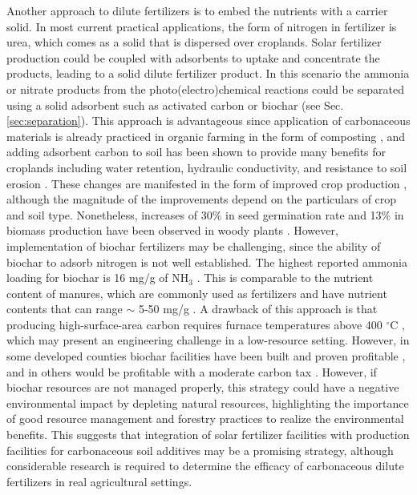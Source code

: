 Another approach to dilute fertilizers is to embed the nutrients with a carrier solid. In most current practical applications, the form of nitrogen in fertilizer is urea, which comes as a solid that is dispersed over croplands. Solar fertilizer production could be coupled with adsorbents to uptake and concentrate the products, leading to a solid dilute fertilizer product. In this scenario the ammonia or nitrate products from the photo(electro)chemical reactions could be separated using a solid adsorbent such as activated carbon or biochar \cite{Gon_alves_2011} (see Sec. \ref{sec:separation}). This approach is advantageous since application of carbonaceous materials is already practiced in organic farming in the form of composting \cite{heckman_2006}, and adding adsorbent carbon to soil has been shown to provide many benefits for croplands including water retention, hydraulic conductivity, and resistance to soil erosion \cite{Li2018}. These changes are manifested in the form of improved crop production \cite{Glaser2002}, although the magnitude of the improvements depend on the particulars of crop and soil type. Nonetheless, increases of 30\% in seed germination rate and 13\% in biomass production have been observed in woody plants \cite{Chidumayo_1994}. However, implementation of biochar fertilizers may be challenging, since the ability of biochar to adsorb nitrogen is not well established. The highest reported ammonia loading for biochar is 16 mg/g of NH$_3$ \cite{Gon_alves_2011}. This is comparable to the nutrient content of manures, which are commonly used as fertilizers and have nutrient contents that can range $\sim$ 5-50 mg/g \cite{Ye}.
A drawback of this approach is that producing high-surface-area carbon requires furnace temperatures above 400 $^\circ$C \cite{Lehmann2007}, which may present an engineering challenge in a low-resource setting. 
However, in some developed counties biochar facilities have been built and proven profitable \cite{McHenry2009}, and in others would be profitable with a moderate carbon tax \cite{Galinato2011}. However, if biochar resources are not managed properly, this strategy could have a negative environmental impact by depleting natural resources, highlighting the importance of good resource management and forestry practices to realize the environmental benefits. This suggests that integration of solar fertilizer facilities with production facilities for carbonaceous soil additives may be a promising strategy, although considerable research is required to determine the efficacy of carbonaceous dilute fertilizers in real agricultural settings.

